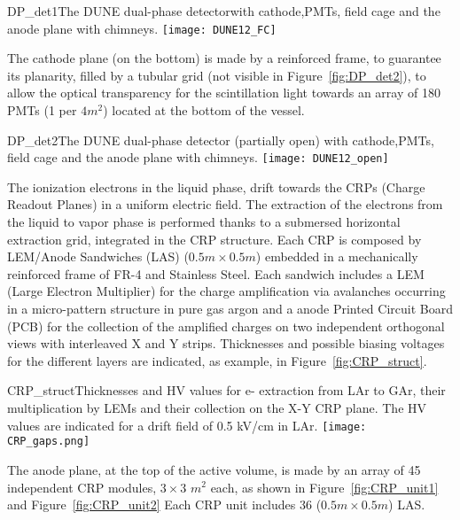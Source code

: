 \begin{cdrfigure}{DP_det1}{The DUNE dual-phase detectorwith cathode,PMTs, field cage and the anode plane with chimneys.}
\texttt{[image: DUNE12\_FC]}
\end{cdrfigure}

The cathode plane (on the bottom) is made by a reinforced frame, to guarantee its planarity, filled by a tubular grid (not visible in Figure~\ref{fig:DP_det2}), to allow the optical transparency for the scintillation light towards an array of 180 PMTs (1 per $4m^2$) located at the bottom of the vessel.

\begin{cdrfigure}{DP_det2}{The DUNE dual-phase detector (partially open) with cathode,PMTs, field cage and the anode plane with chimneys.}
\texttt{[image: DUNE12\_open]}
\end{cdrfigure}

The ionization electrons in the liquid phase, drift towards the CRPs (Charge Readout Planes)  in a uniform electric field. The extraction of the electrons from the liquid to vapor phase is performed thanks to a submersed horizontal extraction grid, integrated in the  CRP structure.  Each CRP is composed by LEM/Anode Sandwiches (LAS) ($0.5m\times 0.5m$) embedded in  a mechanically reinforced frame of FR-4 and Stainless Steel.  Each sandwich includes a  LEM (Large Electron Multiplier) for the charge amplification via avalanches occurring in a micro-pattern structure in pure gas argon and a anode Printed Circuit Board (PCB) for the collection of the amplified charges on two independent orthogonal views with interleaved X and Y strips.  Thicknesses and possible biasing voltages for the different layers are indicated, as example, in Figure~\ref{fig:CRP_struct}. 

\begin{cdrfigure}{CRP_struct}{Thicknesses and HV values for e- extraction from LAr to GAr, their multiplication by LEMs and their collection on the X-Y CRP plane. The HV values are indicated for a drift field of 0.5 kV/cm in LAr.}
\texttt{[image: CRP\_gaps.png]}
\end{cdrfigure}

The anode plane, at the top of the active volume, is made by an array of 45 independent CRP modules, $3\times3$ $m^2$ each, as shown in Figure~\ref{fig:CRP_unit1} and Figure~\ref{fig:CRP_unit2} Each CRP unit includes 36 ($0.5m\times 0.5m$) LAS. 

